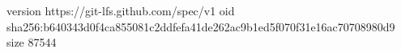 version https://git-lfs.github.com/spec/v1
oid sha256:b640343d0f4ca855081c2ddfefa41de262ac9b1ed5f070f31e16ac70708980d9
size 87544
